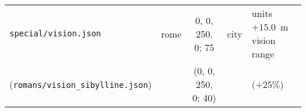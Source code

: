 \documentclass{article}
\begin{document}
\begin{landscape}
\begin{tabular}{l|ccc|l}
\hline
\verb+special/vision.json+                   & rome                   &     0,    0,  250,    0; 75  & city       & units $+15.0$~m vision range \\
(\verb+romans/vision_sibylline.json+)        &                        &    (0,    0,  250,    0; 40) &            & ($+25\%$) \\
\end{tabular}
\end{landscape}


\clearpage
\end{document}
